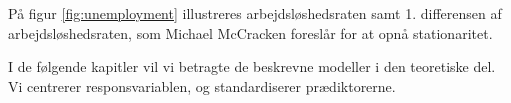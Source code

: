 På figur \ref{fig:unemployment} illustreres arbejdsløshedsraten samt 1. differensen af arbejdsløshedsraten, som Michael McCracken foreslår for at opnå stationaritet.
%


I de følgende kapitler vil vi betragte de beskrevne modeller i den teoretiske del.
Vi centrerer responsvariablen, og standardiserer prædiktorerne.